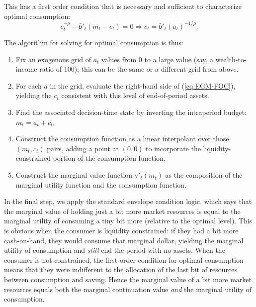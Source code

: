\documentclass{article}
\newcommand{\CRRA}{\rho}
\newcommand{\vFunc}{\mathrm{v}}
\newcommand{\cNrm}{c}
\newcommand{\mNrm}{m}
\newcommand{\aNrm}{a}
\begin{document}
This has a first order condition that is necessary and sufficient to characterize optimal consumption:
\begin{equation}
\label{eq:EGM-FOC}
\cNrm_t^{-\CRRA} - \bar{\mathfrak{v}}'_t(\mNrm_t - \cNrm_t) = 0 \Longrightarrow \cNrm_t = \bar{\mathfrak{v}}'_t(\aNrm_t)^{-1/\CRRA}.
\end{equation}

The algorithm for solving for optimal consumption is thus:

\begin{enumerate}
\item Fix an exogenous grid of $\aNrm_t$ values from 0 to a large value (say, a wealth-to-income ratio of 100); this can be the same or a different grid from above.


\item For each $\aNrm$ in the grid, evaluate the right-hand side of (\ref{eq:EGM-FOC}), yielding the $\cNrm_t$ consistent with this level of end-of-period assets.


\item Find the associated decision-time state by inverting the intraperiod budget: $\mNrm_t = \aNrm_t + \cNrm_t$.


\item Construct the consumption function as a linear interpolant over those $(\mNrm_t, \cNrm_t)$ pairs, adding a point at $(0,0)$ to incorporate the liquidity-constrained portion of the consumption function.


\item Construct the marginal value function $\vFunc'_t(\mNrm_t)$ as the composition of the marginal utility function and the consumption function.
\end{enumerate}

In the final step, we apply the standard envelope condition logic, which says that the marginal value of holding just a bit more market resources is equal to the marginal utility of consuming a tiny bit more (relative to the optimal level). This is obvious when the consumer is liquidity constrained: if they had a bit more cash-on-hand, they would consume that marginal dollar, yielding the marginal utility of consumption and \textit{still} end the period with no assets. When the consumer is not constrained, the first order condition for optimal consumption means that they were indifferent to the allocation of the last bit of resources between consumption and saving. Hence the marginal value of a bit more market resources equals both the marginal continuation value \textit{and} the marginal utility of consumption.
\end{document}

